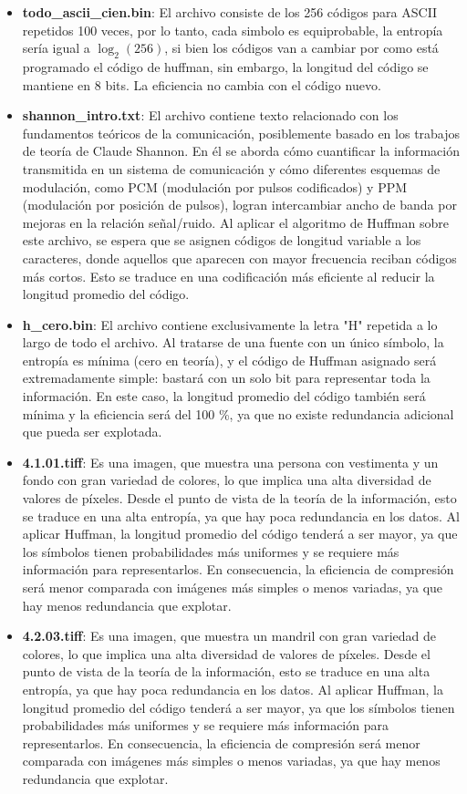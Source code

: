 \documentclass[conference,onecolumn,12pt]{IEEEtran}
\numberwithin{equation}{subsection}
\begin{document}
\begin{itemize}
    \item \textbf{todo\_ascii\_cien.bin}: El archivo consiste de los 256 códigos para ASCII repetidos 100 veces, por lo tanto, cada simbolo es equiprobable, la entropía sería igual a $\log_2(256)$, si bien los códigos van a cambiar por como está programado el código de huffman, sin embargo, la longitud del código se mantiene en 8 bits. La eficiencia no cambia con el código nuevo.
    \item \textbf{shannon\_intro.txt}: El archivo contiene texto relacionado con los fundamentos teóricos de la comunicación, posiblemente basado en los trabajos de teoría de Claude Shannon. En él se aborda cómo cuantificar la información transmitida en un sistema de comunicación y cómo diferentes esquemas de modulación, como PCM (modulación por pulsos codificados) y PPM (modulación por posición de pulsos), logran intercambiar ancho de banda por mejoras en la relación señal/ruido. Al aplicar el algoritmo de Huffman sobre este archivo, se espera que se asignen códigos de longitud variable a los caracteres, donde aquellos que aparecen con mayor frecuencia reciban códigos más cortos. Esto se traduce en una codificación más eficiente al reducir la longitud promedio del código.
    \item \textbf{h\_cero.bin}: El archivo contiene exclusivamente la letra "H" repetida a lo largo de todo el archivo. Al tratarse de una fuente con un único símbolo, la entropía es mínima (cero en teoría), y el código de Huffman asignado será extremadamente simple: bastará con un solo bit para representar toda la información. En este caso, la longitud promedio del código también será mínima y la eficiencia será del 100 \%, ya que no existe redundancia adicional que pueda ser explotada.
    \item \textbf{4.1.01.tiff}: Es una imagen, que muestra una persona con vestimenta y un fondo con gran variedad de colores, lo que implica una alta diversidad de valores de píxeles. Desde el punto de vista de la teoría de la información, esto se traduce en una alta entropía, ya que hay poca redundancia en los datos. Al aplicar Huffman, la longitud promedio del código tenderá a ser mayor, ya que los símbolos tienen probabilidades más uniformes y se requiere más información para representarlos. En consecuencia, la eficiencia de compresión será menor comparada con imágenes más simples o menos variadas, ya que hay menos redundancia que explotar.
    \item \textbf{4.2.03.tiff}: Es una imagen, que muestra un mandril con gran variedad de colores, lo que implica una alta diversidad de valores de píxeles. Desde el punto de vista de la teoría de la información, esto se traduce en una alta entropía, ya que hay poca redundancia en los datos. Al aplicar Huffman, la longitud promedio del código tenderá a ser mayor, ya que los símbolos tienen probabilidades más uniformes y se requiere más información para representarlos. En consecuencia, la eficiencia de compresión será menor comparada con imágenes más simples o menos variadas, ya que hay menos redundancia que explotar.

\end{itemize}
\end{document}
